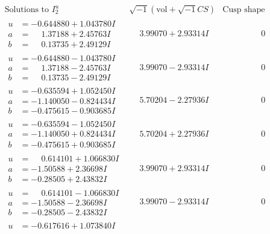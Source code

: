 \documentclass[1p]{elsarticle_modified}
\theoremstyle{definition}
\newcommand{\I}{\sqrt{-1}}
\begin{document}
$$\begin{array}{c|c|c}
\text{Solutions to }I^u_{2}& \I (\text{vol} + \sqrt{-1}CS) & \text{Cusp shape}\\
 \hline 
\begin{aligned}
u &= -0.644880 + 1.043780 I \\
a &= \phantom{-}1.37188 + 2.45763 I \\
b &= \phantom{-}0.13735 + 2.49129 I\end{aligned}
 & \phantom{-}3.99070 + 2.93314 I & \phantom{-0.000000 } 0 \\ \hline\begin{aligned}
u &= -0.644880 - 1.043780 I \\
a &= \phantom{-}1.37188 - 2.45763 I \\
b &= \phantom{-}0.13735 - 2.49129 I\end{aligned}
 & \phantom{-}3.99070 - 2.93314 I & \phantom{-0.000000 } 0 \\ \hline\begin{aligned}
u &= -0.635594 + 1.052450 I \\
a &= -1.140050 - 0.824434 I \\
b &= -0.475615 - 0.903685 I\end{aligned}
 & \phantom{-}5.70204 - 2.27936 I & \phantom{-0.000000 } 0 \\ \hline\begin{aligned}
u &= -0.635594 - 1.052450 I \\
a &= -1.140050 + 0.824434 I \\
b &= -0.475615 + 0.903685 I\end{aligned}
 & \phantom{-}5.70204 + 2.27936 I & \phantom{-0.000000 } 0 \\ \hline\begin{aligned}
u &= \phantom{-}0.614101 + 1.066830 I \\
a &= -1.50588 + 2.36698 I \\
b &= -0.28505 + 2.43832 I\end{aligned}
 & \phantom{-}3.99070 + 2.93314 I & \phantom{-0.000000 } 0 \\ \hline\begin{aligned}
u &= \phantom{-}0.614101 - 1.066830 I \\
a &= -1.50588 - 2.36698 I \\
b &= -0.28505 - 2.43832 I\end{aligned}
 & \phantom{-}3.99070 - 2.93314 I & \phantom{-0.000000 } 0 \\ \hline\begin{aligned}
u &= -0.617616 + 1.073840 I \\

\end{aligned}
\end{array}$$
\end{document}
